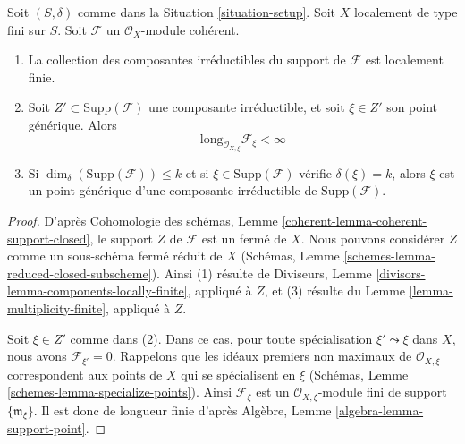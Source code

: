\begin{lemma}
\label{lemma-length-finite}
Soit $(S, \delta)$ comme dans la Situation \ref{situation-setup}.
Soit $X$ localement de type fini sur $S$.
Soit $\mathcal{F}$ un $\mathcal{O}_X$-module cohérent.
\begin{enumerate}
\item La collection des composantes irréductibles du support de
$\mathcal{F}$ est localement finie.
\item Soit $Z' \subset \text{Supp}(\mathcal{F})$
une composante irréductible, et
soit $\xi \in Z'$ son point générique.
Alors
$$
\text{long}_{\mathcal{O}_{X, \xi}} \mathcal{F}_\xi < \infty
$$
\item Si $\dim_\delta(\text{Supp}(\mathcal{F})) \leq k$
et si $\xi \in \text{Supp}(\mathcal{F})$ vérifie $\delta(\xi) = k$, alors $\xi$ est un
point générique d'une composante irréductible de $\text{Supp}(\mathcal{F})$.
\end{enumerate}
\end{lemma}

\begin{proof}
D'après Cohomologie des schémas, Lemme \ref{coherent-lemma-coherent-support-closed},
le support $Z$ de $\mathcal{F}$ est un fermé de $X$.
Nous pouvons considérer $Z$ comme un sous-schéma fermé réduit de $X$
(Schémas, Lemme \ref{schemes-lemma-reduced-closed-subscheme}).
Ainsi (1) résulte de
Diviseurs, Lemme \ref{divisors-lemma-components-locally-finite}, appliqué à $Z$,
et (3) résulte du
Lemme \ref{lemma-multiplicity-finite}, appliqué à $Z$.

\medskip\noindent
Soit $\xi \in Z'$ comme dans (2). Dans ce cas, pour toute spécialisation
$\xi' \leadsto \xi$ dans $X$, nous avons $\mathcal{F}_{\xi'} = 0$.
Rappelons que les idéaux premiers non maximaux de $\mathcal{O}_{X, \xi}$ correspondent
aux points de $X$ qui se spécialisent en $\xi$
(Schémas, Lemme \ref{schemes-lemma-specialize-points}).
Ainsi $\mathcal{F}_\xi$ est un $\mathcal{O}_{X, \xi}$-module fini
de support $\{\mathfrak m_\xi\}$. Il est donc de longueur finie
d'après Algèbre, Lemme \ref{algebra-lemma-support-point}.
\end{proof}

